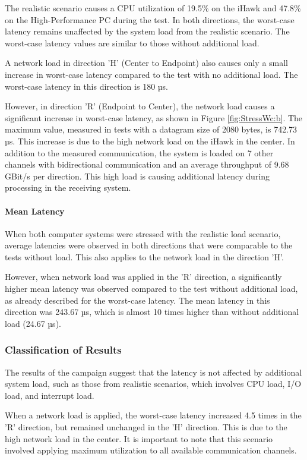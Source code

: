 The realistic scenario causes a CPU utilization of 19.5\% on the iHawk and 47.8\% on the High-Performance PC during the test. In both directions, the worst-case latency remains unaffected by the system load from the realistic scenario. The worst-case latency values are similar to those without additional load.

A network load in direction 'H' (Center to Endpoint) also causes only a small increase in worst-case latency compared to the test with no additional load. The worst-case latency in this direction is 180 µs.

However, in direction 'R' (Endpoint to Center), the network load causes a significant increase in worst-case latency, as shown in Figure \ref{fig:StressWc:b}. The maximum value, measured in tests with a datagram size of 2080 bytes, is 742.73 µs. This increase is due to the high network load on the iHawk in the center. In addition to the measured communication, the system is loaded on 7 other channels with bidirectional communication and an average throughput of 9.68 GBit/s per direction. This high load is causing additional latency during processing in the receiving system.

\paragraph{Mean Latency}
When both computer systems were stressed with the realistic load scenario, average latencies were observed in both directions that were comparable to the tests without load. This also applies to the network load in the direction 'H'.

However, when network load was applied in the 'R' direction, a significantly higher mean latency was observed compared to the test without additional load, as already described for the worst-case latency. The mean latency in this direction was 243.67 µs, which is almost 10 times higher than without additional load (24.67 µs).

\subsubsection{Classification of Results}
The results of the campaign suggest that the latency is not affected by additional system load, such as those from realistic scenarios, which involves CPU load, I/O load, and interrupt load.

When a network load is applied, the worst-case latency increased 4.5 times in the 'R' direction, but remained unchanged in the 'H' direction. This is due to the high network load in the center. It is important to note that this scenario involved applying maximum utilization to all available communication channels.

